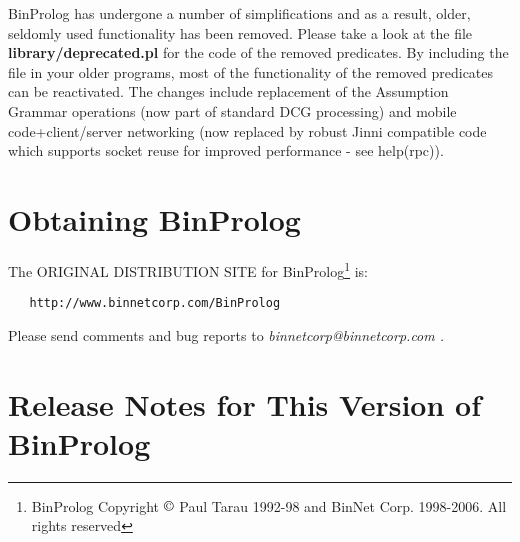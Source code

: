 \documentclass{article}
\begin{document}
BinProlog  has undergone a number of simplifications and as a result, older,
seldomly used functionality has been removed. Please take a look at the file
{\bf library/deprecated.pl} for the code of the removed predicates. By including
the file in your older programs, most of the functionality of the removed
predicates can be reactivated. The changes include replacement of the Assumption Grammar
operations (now part of standard DCG processing) and mobile code+client/server 
networking (now replaced by robust Jinni  compatible code which
supports socket reuse for improved performance - see help(rpc)).

\section{Obtaining BinProlog}

The ORIGINAL DISTRIBUTION SITE for BinProlog\footnote{BinProlog Copyright $\copyright$ Paul Tarau 1992-98 and BinNet Corp. 1998-2006. All rights reserved} is:

\begin{verbatim}
   http://www.binnetcorp.com/BinProlog
\end{verbatim}

Please send comments and bug reports to {\em binnetcorp@binnetcorp.com .}

\section{Release Notes for This Version of BinProlog}
\end{document}

